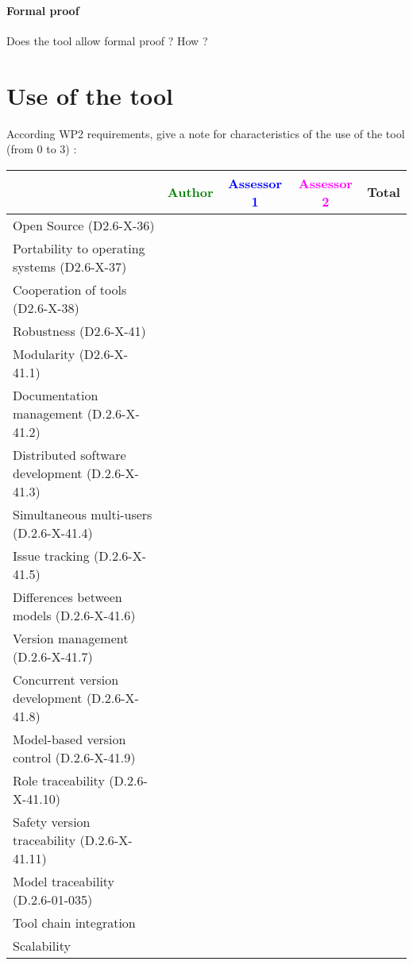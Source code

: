 \paragraph{Formal proof}
Does the tool allow formal proof ?  How ?



\section{Use of the tool}


According WP2 requirements, give a note for characteristics of the use of the tool (from 0 to 3) :

\begin{tabular}{|l | c | c | c | c|}
\hline
& \textcolor{green}{Author} & \textcolor{blue}{Assessor 1} & \textcolor{magenta}{Assessor 2} & Total \\
\hline 
Open Source (D2.6-X-36) & & & &  \\
\hline 
Portability to operating systems (D2.6-X-37) & & & &  \\
\hline
Cooperation of tools (D2.6-X-38) & & & &  \\
\hline
Robustness (D2.6-X-41) & & & & \\
\hline
Modularity (D2.6-X-41.1) & & & & \\
\hline
Documentation management (D.2.6-X-41.2) & & & & \\
\hline
Distributed software development (D.2.6-X-41.3)  & & & & \\
\hline
Simultaneous multi-users (D.2.6-X-41.4)   & & & & \\
\hline
Issue tracking (D.2.6-X-41.5) & & & & \\
\hline
Differences between models (D.2.6-X-41.6) & & & & \\
\hline
Version management (D.2.6-X-41.7) & & & & \\
\hline
Concurrent version development (D.2.6-X-41.8) & & & & \\
\hline
Model-based version control (D.2.6-X-41.9) & & & & \\
\hline
Role traceability (D.2.6-X-41.10) & & & & \\
\hline
Safety version traceability (D.2.6-X-41.11) & & & & \\
\hline
Model traceability (D.2.6-01-035) & & & & \\
\hline
Tool chain integration & & & & \\
\hline
Scalability & & & & \\
\hline
\end{tabular}

